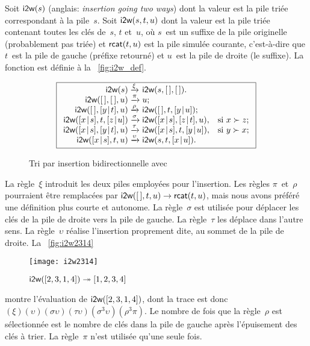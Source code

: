 Soit \(\textsf{i2w}(s)\) (anglais: \emph{insertion
  going two ways}) dont la valeur est la pile triée correspondant à la
pile~\(s\). Soit \(\textsf{i2w}(s,t,u)\) dont la
valeur est la pile triée contenant toutes les clés de~\(s\), \(t\)
et~\(u\), où \(s\)~est un suffixe de la pile originelle (probablement
pas triée) et \(\textsf{rcat}(t,u)\) est la pile
simulée courante, c'est-à-dire que \(t\)~est la pile de gauche
(préfixe retourné) et \(u\)~est la pile de droite (le suffixe). La
fonction  est définie à la
\fig~\vref{fig:i2w_def}.
\begin{figure}[b]
\begin{equation*}
\boxed{%
\begin{array}{r@{\;}l@{\;}ll}
\fun{i2w}(s)         & \xrightarrow{\smash{\xi}}
                     & \fun{i2w}(s,\el,\el).\\
\fun{i2w}(\el,\el,u) & \xrightarrow{\smash{\pi}}
                     & u;\\
\fun{i2w}(\el,\cons{y}{t},u)
                     & \xrightarrow{\smash{\rho}}
                     & \fun{i2w}(\el,t,\cons{y}{u});\\
\fun{i2w}(\cons{x}{s},t,\cons{z}{u})
                     & \xrightarrow{\smash{\sigma}}
                     & \fun{i2w}(\cons{x}{s},\cons{z}{t},u),
                     & \text{si \(x \succ z\)};\\
\fun{i2w}(\cons{x}{s},\cons{y}{t},u)
                     & \xrightarrow{\smash{\tau}}
                     & \fun{i2w}(\cons{x}{s},t,\cons{y}{u}),
                     & \text{si \(y \succ x\)};\\
\fun{i2w}(\cons{x}{s},t,u)
                     & \xrightarrow{\smash{\upsilon}}
                     & \fun{i2w}(s,t,\cons{x}{u}).
\end{array}}
\end{equation*}
\caption{Tri par insertion bidirectionnelle avec }
\label{fig:i2w_def}
\end{figure}
La règle~\(\xi\) introduit les deux piles employées pour
l'insertion. Les règles \(\pi\)~et~\(\rho\) pourraient être remplacées
par \(\textsf{i2w}([\,],t,u) \rightarrow \textsf{rcat}(t,u)\), mais nous
avons préféré une définition plus courte et autonome. La
règle~\(\sigma\) est utilisée pour déplacer les clés de la pile de
droite vers la pile de gauche. La règle~\(\tau\) les déplace dans
l'autre sens. La règle~\(\upsilon\) réalise l'insertion proprement
dite, au sommet de la pile de droite. La \fig~\vref{fig:i2w2314}
\begin{figure}
\centering
\texttt{[image: i2w2314]}
\caption{\(\textsf{i2w}([2,3,1,4]) \twoheadrightarrow [1,2,3,4]\)}
\label{fig:i2w2314}
\end{figure}
montre l'évaluation  de
\(\textsf{i2w}([2,3,1,4])\), dont la trace est donc
\((\xi)(\upsilon)(\sigma\upsilon)
(\tau\upsilon)(\sigma^3\upsilon)(\rho^3\pi)\). Le nombre de fois que
la règle~\(\rho\) est sélectionnée est le nombre de clés dans la pile
de gauche après l'épuisement des clés à trier. La règle~\(\pi\) n'est
utilisée qu'une seule fois.

